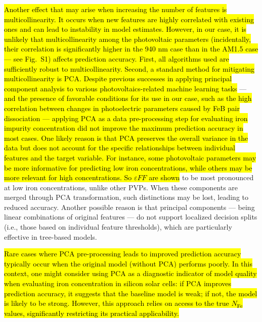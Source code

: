 \documentclass[a4paper,fleqn,draft]{cas-sc}
\begin{document}
\textcolor[rgb]{1.00,0.07,0.00}{
\hl{
Another effect that may arise when increasing the number of features is multicollinearity.
It occurs when new features are highly correlated with existing ones and can lead to instability in model estimates.
However, in our case, it is unlikely that multicollinearity among the photovoltaic parameters
(incidentally, their correlation is significantly higher in the 940 nm case than in the AM1.5 case — see Fig.~S1)
affects prediction accuracy.
First, all algorithms used are sufficiently robust to multicollinearity.
Second, a standard method for mitigating multicollinearity is PCA.
Despite previous successes in applying principal component analysis to various
photovoltaics-related machine learning tasks} \cite{Gao2020,Fadhel2019,David2021,Liu2022,AbdullahVetter2025} ---
\hl{and the presence of favorable conditions for its use in our case,
such as the high correlation between changes in photoelectric parameters caused by FeB pair dissociation ---
applying PCA as a data pre-processing step for evaluating iron impurity concentration did not improve the maximum prediction accuracy in most cases.
One likely reason is that PCA preserves the overall variance in the data
but does not account for the specific relationships between individual features and the target variable.
For instance, some photovoltaic parameters may be more informative for predicting low iron concentrations,
while others may be more relevant for high concentrations.
So $\varepsilon F\!F$ are shown} \cite{Olikh2025MSEB} to be most pronounced at low iron concentrations, unlike other PVPs.
When these components are merged through PCA transformation, such distinctions may be lost, leading to reduced accuracy.
Another possible reason is that principal components ---
being linear combinations of original features --- do not support localized decision splits
(i.e., those based on individual feature thresholds), which are particularly effective in tree-based models.
}

\textcolor[rgb]{1.00,0.07,0.00}{
\hl{
Rare cases where PCA pre-processing leads to improved prediction accuracy typically
occur when the original model (without PCA) performs poorly.
In this context, one might consider using PCA as a diagnostic indicator of model quality
when evaluating iron concentration in silicon solar cells:
if PCA improves prediction accuracy, it suggests that the baseline model is weak;
if not, the model is likely to be strong.
However, this approach relies on access to the true $N_\mathrm{Fe}$ values,
significantly restricting its practical applicability.
}}
\end{document}
